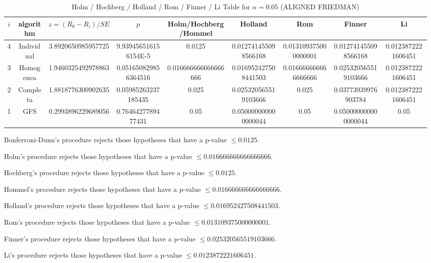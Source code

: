 \documentclass[a4paper,10pt]{article}
\begin{document}
\begin{landscape}
\begin{table}[!htp]
\centering\scriptsize
\caption{Holm / Hochberg / Holland / Rom / Finner / Li Table for $\alpha=0.05$ (ALIGNED FRIEDMAN)}
\begin{tabular}{ccccccccc}
$i$&algorithm&$z=(R_0 - R_i)/SE$&$p$&Holm/Hochberg/Hommel&Holland&Rom&Finner&Li\\
\hline
4&Individual&3.8920650985957725&9.939456516156154E-5&0.0125&0.012741455098566168&0.013109375000000001&0.012741455098566168&0.0123872221606451\\
3&Homogenea&1.9460325492978863&0.051650829856364516&0.016666666666666666&0.016952427508441503&0.016666666666666666&0.025320565519103666&0.0123872221606451\\
2&Completa&1.8818776300902635&0.05985263237185435&0.025&0.025320565519103666&0.025&0.03773939976903784&0.0123872221606451\\
1&GFS&0.2993896229689056&0.7646427789477431&0.05&0.050000000000000044&0.05&0.050000000000000044&0.05\\
\hline
\end{tabular}
\end{table}
Bonferroni-Dunn's procedure rejects those hypotheses that have a p-value $\le0.0125$.


Holm's procedure rejects those hypotheses that have a p-value $\le0.016666666666666666$.


Hochberg's procedure rejects those hypotheses that have a p-value $\le0.0125$.


Hommel's procedure rejects those hypotheses that have a p-value $\le0.016666666666666666$.


Holland's procedure rejects those hypotheses that have a p-value $\le0.016952427508441503$.


Rom's procedure rejects those hypotheses that have a p-value $\le0.013109375000000001$.


Finner's procedure rejects those hypotheses that have a p-value $\le0.025320565519103666$.


Li's procedure rejects those hypotheses that have a p-value $\le0.0123872221606451$.



\newpage


\end{landscape}
\end{document}

